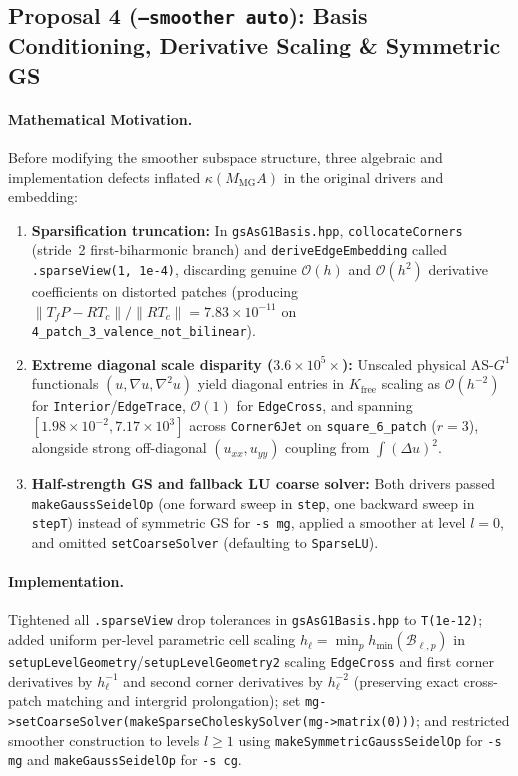 \documentclass[10pt,a4paper]{article}
\begin{document}
\subsection{Proposal 4 (\texttt{--smoother auto}): Basis Conditioning, Derivative Scaling \& Symmetric GS}
\paragraph{Mathematical Motivation.}
Before modifying the smoother subspace structure, three algebraic and implementation defects inflated $\kappa(M_{\text{MG}}A)$ in the original drivers and embedding:
\begin{enumerate}
  \item \textbf{Sparsification truncation:} In \texttt{gsAsG1Basis.hpp}, \texttt{collocateCorners} (stride~2 first-biharmonic branch) and \texttt{deriveEdgeEmbedding} called \texttt{.sparseView(1, 1e-4)}, discarding genuine $\mathcal{O}(h)$ and $\mathcal{O}(h^2)$ derivative coefficients on distorted patches (producing $\|T_f P - R T_c\|/\|R T_c\| = 7.83\times 10^{-11}$ on \texttt{4\_patch\_3\_valence\_not\_bilinear}).
  \item \textbf{Extreme diagonal scale disparity ($3.6\times 10^5\times$):} Unscaled physical AS-$G^1$ functionals $(u, \nabla u, \nabla^2 u)$ yield diagonal entries in $K_{\text{free}}$ scaling as $\mathcal{O}(h^{-2})$ for \texttt{Interior}/\texttt{EdgeTrace}, $\mathcal{O}(1)$ for \texttt{EdgeCross}, and spanning $[1.98\times 10^{-2}, 7.17\times 10^3]$ across \texttt{Corner6Jet} on \texttt{square\_6\_patch} ($r=3$), alongside strong off-diagonal $(u_{xx}, u_{yy})$ coupling from $\int (\Delta u)^2$.
  \item \textbf{Half-strength GS and fallback LU coarse solver:} Both drivers passed \texttt{makeGaussSeidelOp} (one forward sweep in \texttt{step}, one backward sweep in \texttt{stepT}) instead of symmetric GS for \texttt{-s mg}, applied a smoother at level $l=0$, and omitted \texttt{setCoarseSolver} (defaulting to \texttt{SparseLU}).
\end{enumerate}

\paragraph{Implementation.}
Tightened all \texttt{.sparseView} drop tolerances in \texttt{gsAsG1Basis.hpp} to \texttt{T(1e-12)}; added uniform per-level parametric cell scaling $h_\ell = \min_p h_{\min}(\mathcal{B}_{\ell,p})$ in \texttt{setupLevelGeometry}/\texttt{setupLevelGeometry2} scaling \texttt{EdgeCross} and first corner derivatives by $h_\ell^{-1}$ and second corner derivatives by $h_\ell^{-2}$ (preserving exact cross-patch matching and intergrid prolongation); set \texttt{mg->setCoarseSolver(makeSparseCholeskySolver(mg->matrix(0)))}; and restricted smoother construction to levels $l \ge 1$ using \texttt{makeSymmetricGaussSeidelOp} for \texttt{-s mg} and \texttt{makeGaussSeidelOp} for \texttt{-s cg}.
\end{document}
